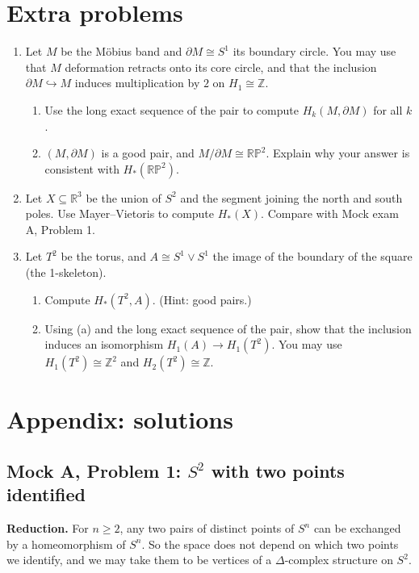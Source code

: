 \documentclass[11pt]{article}
\newcommand{\Z}{\mathbb Z}
\newcommand{\R}{\mathbb R}
\newcommand{\RP}{\mathbb{RP}}
\begin{document}
\section*{Extra problems}
\begin{enumerate}[label=\textbf{E\arabic*.},leftmargin=*]
\item Let $M$ be the Möbius band and $\partial M\cong S^1$ its boundary circle. You may use that $M$ deformation retracts onto its core circle, and that the inclusion $\partial M\hookrightarrow M$ induces multiplication by $2$ on $H_1\cong\Z$.
\begin{enumerate}[label=(\alph*)]
\item Use the long exact sequence of the pair to compute $H_k(M,\partial M)$ for all $k$.
\item $(M,\partial M)$ is a good pair, and $M/\partial M\cong\RP^2$. Explain why your answer is consistent with $H_*(\RP^2)$.
\end{enumerate}
\item Let $X\subseteq\R^3$ be the union of $S^2$ and the segment joining the north and south poles. Use Mayer--Vietoris to compute $H_*(X)$. Compare with Mock exam A, Problem 1.
\item Let $T^2$ be the torus, and $A\cong S^1\vee S^1$ the image of the boundary of the square (the 1-skeleton).
\begin{enumerate}[label=(\alph*)]
\item Compute $H_*(T^2,A)$. (Hint: good pairs.)
\item Using (a) and the long exact sequence of the pair, show that the inclusion induces an isomorphism $H_1(A)\to H_1(T^2)$. You may use $H_1(T^2)\cong\Z^2$ and $H_2(T^2)\cong\Z$.
\end{enumerate}
\end{enumerate}

\clearpage
\appendix
\section*{Appendix: solutions}

\subsection*{Mock A, Problem 1: $S^2$ with two points identified}

\textbf{Reduction.} For $n\ge2$, any two pairs of distinct points of $S^n$ can be exchanged by a homeomorphism of $S^n$. So the space does not depend on which two points we identify, and we may take them to be vertices of a $\Delta$-complex structure on $S^2$.
\end{document}
